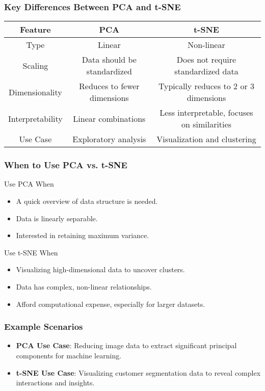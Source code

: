 \documentclass[aspectratio=169]{beamer}
\begin{document}
\begin{frame}[fragile]
    \frametitle{Key Differences Between PCA and t-SNE}
    \begin{tabular}{|c|c|c|}
        \hline
        \textbf{Feature} & \textbf{PCA} & \textbf{t-SNE} \\
        \hline
        Type & Linear & Non-linear \\
        \hline
        Scaling & Data should be standardized & Does not require standardized data \\
        \hline
        Dimensionality & Reduces to fewer dimensions & Typically reduces to 2 or 3 dimensions \\
        \hline
        Interpretability & Linear combinations & Less interpretable, focuses on similarities \\
        \hline
        Use Case & Exploratory analysis & Visualization and clustering \\
        \hline
    \end{tabular}
\end{frame}

\begin{frame}[fragile]
    \frametitle{When to Use PCA vs. t-SNE}
    \begin{block}{Use PCA When}
        \begin{itemize}
            \item A quick overview of data structure is needed.
            \item Data is linearly separable.
            \item Interested in retaining maximum variance.
        \end{itemize}
    \end{block}

    \begin{block}{Use t-SNE When}
        \begin{itemize}
            \item Visualizing high-dimensional data to uncover clusters.
            \item Data has complex, non-linear relationships.
            \item Afford computational expense, especially for larger datasets.
        \end{itemize}
    \end{block}
\end{frame}

\begin{frame}[fragile]
    \frametitle{Example Scenarios}
    \begin{itemize}
        \item \textbf{PCA Use Case}: Reducing image data to extract significant principal components for machine learning.
        \item \textbf{t-SNE Use Case}: Visualizing customer segmentation data to reveal complex interactions and insights.
    \end{itemize}
\end{frame}
\end{document}
